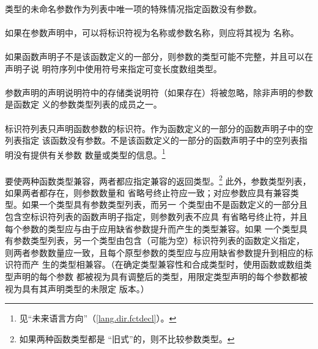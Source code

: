 \paragraph{}
类型的未命名参数作为列表中唯一项的特殊情况指定函数没有参数。

\paragraph{}
如果在参数声明中，可以将标识符视为名称或参数名称，则应将其视为
名称。

\paragraph{}
如果函数声明子不是该函数定义的一部分，则参数的类型可能不完整，并且可以在声明子说
明符序列中使用\tm{[*]}符号来指定可变长度数组类型。

\paragraph{}
参数声明的声明说明符中的存储类说明符（如果存在）将被忽略，除非声明的参数是函数定
义的参数类型列表的成员之一。

\paragraph{}
标识符列表只声明函数参数的标识符。作为函数定义的一部分的函数声明子中的空列表指定
该函数没有参数。不是该函数定义的一部分的函数声明子中的空列表指明没有提供有关参数
数量或类型的信息。\footnote{见``未来语言方向''（\ref{lang.dir.fctdecl}）。}

\paragraph{}
要使两种函数类型兼容，两者都应指定兼容的返回类型。\footnote{如果两种函数类型都是
``旧式''的，则不比较参数类型。} 此外，参数类型列表，如果两者都存在，则参数数量和
省略号终止符应一致；对应参数应具有兼容类型。如果一个类型具有参数类型列表，而另一
个类型由不是函数定义的一部分且包含空标识符列表的函数声明子指定，则参数列表不应具
有省略号终止符，并且每个参数的类型应与由于应用缺省参数提升而产生的类型兼容。如果
一个类型具有参数类型列表，另一个类型由包含（可能为空）标识符列表的函数定义指定，
则两者参数数量应一致，且每个原型参数的类型应与应用缺省参数提升到相应的标识符而产
生的类型相兼容。（在确定类型兼容性和合成类型时，使用函数或数组类型声明的每个参数
都被视为具有调整后的类型，用限定类型声明的每个参数都被视为具有其声明类型的未限定
版本。）

